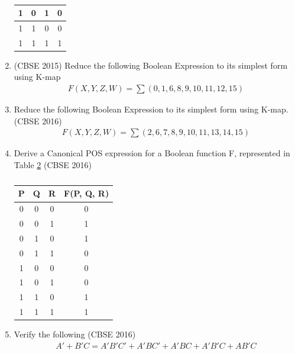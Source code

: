 \begin{enumerate}[label=\arabic*.,ref=\theenumi]
\begin{table}[!ht]
\begin{tabular}{|c|c|c|c|}
\hline
1 & 0 & 1 & 0 \\ 
\hline
1 & 1 & 0 & 0 \\
\hline
1 & 1 & 1 & 1 \\
\hline
\end{tabular}
		\caption{}
\label{tab:2015-1/c/6/c}
\end{table}
	\item 
\label{prob:2015/c/6/d}
\hfill (CBSE 2015)
		Reduce the following Boolean Expression to its simplest form using K-map
		\begin{align}
\label{eq:2015/c/6/d}
F(X,Y,Z,W)= \sum (0,1,6,8,9,10,11,12,15)
		\end{align}
	\item Reduce the following Boolean Expression to its simplest form using K-map.
\label{prob:2016/c/6/d}
\hfill (CBSE 2016)
		\begin{align}
\label{eq:2016/c/6/d}
			F(X,Y,Z,W)= \sum(2,6,7,8,9,10,11,13,14,15)
		\end{align}
	\item Derive a Canonical POS expression for a Boolean function  F, represented in Table
\ref{tab:2016/c/6/c}
\hfill (CBSE 2016)
\label{prob:2016/c/6/c}
		\begin{table}[!ht]
			\centering
			\begin{tabular}{|c|c|c|c|}

 \hline
 P & Q & R & F(P,  Q,  R) \\
 \hline
 0  & 0  & 0 & 0  \\
\hline
0  & 0  & 1 & 1  \\
\hline
0  & 1  & 0 & 1  \\
\hline
0  & 1  & 1 & 0  \\
\hline
1  & 0  & 0 & 0  \\
\hline
1  & 0  & 1 & 0  \\
\hline
1  & 1  & 0 & 1  \\
\hline
1  & 1  & 1 & 1  \\
\hline
\end{tabular}
			\caption{}
\label{tab:2016/c/6/c}
		\end{table}
	\item Verify the following 
\hfill (CBSE 2016)
\label{prob:2016/c/6/a}
		\begin{align}
\label{eq:2016/c/6/a}
A'+B'C = A'B'C' + A'BC' + A'BC + A'B'C + AB'C
		\end{align}



\end{enumerate}
